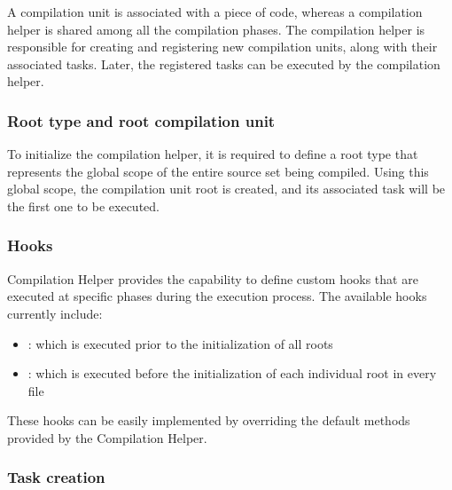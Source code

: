 A compilation unit is associated with a piece of code, whereas a compilation helper is shared among all the compilation phases. The compilation helper is responsible for creating and registering new compilation units, along with their associated tasks. Later, the registered tasks can be executed by the compilation helper.

\subsubsection{Root type and root compilation unit}

To initialize the compilation helper, it is required to define a root type that represents the global scope of the entire source set being compiled. Using this global scope, the compilation unit root is created, and its associated task will be the first one to be executed.

\subsubsection{Hooks}

Compilation Helper provides the capability to define custom hooks that are executed at specific phases during the execution process.
The available hooks currently include:

\begin{itemize}
    \item {}: which is executed prior to the initialization of all roots
    \item {}: which is executed before the initialization of each individual root in every file
\end{itemize}
These hooks can be easily implemented by overriding the default methods provided by the Compilation Helper.

\subsubsection{Task creation}

